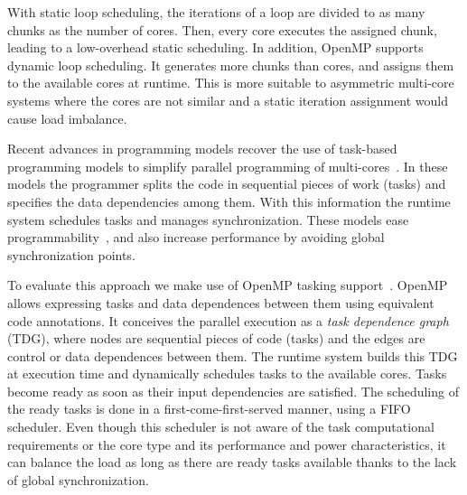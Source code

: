 With static loop scheduling, the iterations of a loop are divided to as many chunks as the number of cores.
Then, every core executes the assigned chunk, leading to a low-overhead static scheduling.
In addition, OpenMP supports dynamic loop scheduling. 
It generates more chunks than cores, and assigns them to the available cores at runtime. 
This is more suitable to asymmetric multi-core systems where the cores are not similar and a static iteration assignment would cause load imbalance.

Recent advances in programming models recover the use of task-based programming models to simplify parallel programming of multi-cores~\cite{OpenMP4.0:Manual2013, OmpSs_PPL11, Zuckerman:EXADAPT2011, Bauer.2012.SC, Vandierendonck:PACT2011}. 
In these models the programmer splits the code in sequential pieces of work (tasks) and specifies the data dependencies among them.  
With this information the runtime system schedules tasks and manages synchronization. These models ease programmability~\cite{OpenMP4.0:Manual2013, OmpSs_PPL11, Zuckerman:EXADAPT2011, Bauer.2012.SC, Vandierendonck:PACT2011, Vandierendonck:Hyperq},
and also increase performance by avoiding global synchronization points.

To evaluate this approach we make use of OpenMP tasking support~\cite{OpenMP4.0:Manual2013}. 
OpenMP allows expressing tasks and data dependences between them using equivalent code annotations. 
It conceives the parallel execution as a \emph{task dependence graph} (TDG), where nodes are 
sequential pieces of code (tasks) and the edges are control or data dependences between them. 
The runtime system builds this TDG at execution time and dynamically schedules tasks to the available cores.
Tasks become ready as soon as their input dependencies are satisfied.
The scheduling of the ready tasks is done in a first-come-first-served manner, using a FIFO scheduler.  
Even though this scheduler is not aware of the task computational requirements or the core type and its performance and power characteristics, it can balance the load as long as there are ready tasks available thanks to the lack of global synchronization.

